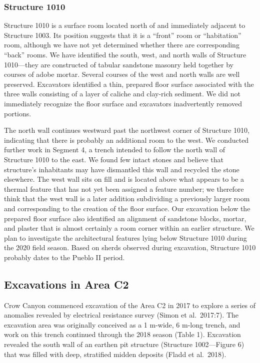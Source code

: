 \documentclass[
  12pt,
]{krantz}
\begin{document}
\hypertarget{structure-1010}{%
\subsubsection{Structure 1010}\label{structure-1010}}

Structure 1010 is a surface room located north of and immediately
adjacent to Structure 1003. Its position suggests that it is a ``front''
room or ``habitation'' room, although we have not yet determined whether
there are corresponding ``back'' rooms. We have identified the south,
west, and north walls of Structure 1010---they are constructed of
tabular sandstone masonry held together by courses of adobe mortar.
Several courses of the west and north walls are well preserved.
Excavators identified a thin, prepared floor surface associated with the
three walls consisting of a layer of caliche and clay-rich sediment. We
did not immediately recognize the floor surface and excavators
inadvertently removed portions.

The north wall continues westward past the northwest corner of Structure
1010, indicating that there is probably an additional room to the west.
We conducted further work in Segment 4, a trench intended to follow the
north wall of Structure 1010 to the east. We found few intact stones and
believe that structure's inhabitants may have dismantled this wall and
recycled the stone elsewhere. The west wall sits on fill and is located
above what appears to be a thermal feature that has not yet been
assigned a feature number; we therefore think that the west wall is a
later addition subdividing a previously larger room and corresponding to
the creation of the floor surface. Our excavation below the prepared
floor surface also identified an alignment of sandstone blocks, mortar,
and plaster that is almost certainly a room corner within an earlier
structure. We plan to investigate the architectural features lying below
Structure 1010 during the 2020 field season. Based on sherds observed
during excavation, Structure 1010 probably dates to the Pueblo II
period.

\hypertarget{excavations-in-area-c2}{%
\subsection{Excavations in Area C2}\label{excavations-in-area-c2}}

Crow Canyon commenced excavation of the Area C2 in 2017 to explore a
series of anomalies revealed by electrical resistance survey (Simon et
al.~2017:7). The excavation area was originally conceived as a 1 m-wide,
6 m-long trench, and work on this trench continued through the 2018
season (Table 1). Excavation revealed the south wall of an earthen pit
structure (Structure 1002---Figure 6) that was filled with deep,
stratified midden deposits (Fladd et al.~2018).
\end{document}
